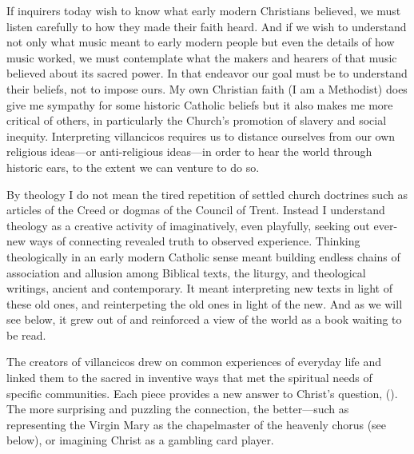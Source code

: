 
If inquirers today wish to know what early modern Christians believed, we
must listen carefully to how they made their faith heard.
And if we wish to understand not only what music meant to early
modern people but even the details of how music worked, we must contemplate
what the makers and hearers of that music believed about its sacred power. 
In that endeavor our goal must be to understand their beliefs, not to impose
ours.
My own Christian faith (I am a Methodist) does give me sympathy for some
historic Catholic beliefs but it also makes me more critical of others, in
particularly the Church's promotion of slavery and social inequity.
Interpreting villancicos requires us to distance ourselves from our own
religious ideas---or anti-religious ideas---in order to hear the world through
historic ears, to the extent we can venture to do so.%
    \Autocites
    {Burstyn:PeriodEar}
    [for an example of the anti-religious approach, see][]{Menache:Vox}

By theology I do not mean the tired repetition of settled church doctrines such
as articles of the Creed or dogmas of the Council of Trent.
Instead I understand theology as a creative activity of imaginatively, even
playfully, seeking out ever-new ways of connecting revealed truth to observed
experience.
Thinking theologically in an early modern Catholic sense meant building 
endless chains of association and allusion among Biblical texts, the liturgy,
and theological writings, ancient and contemporary.
It meant interpreting new texts in light of these old ones, and reinterpeting
the old ones in light of the new.
And as we will see below, it grew out of and reinforced a view of the world as
a book waiting to be read.


The creators of villancicos drew on common experiences of everyday life and
linked them to the sacred in inventive ways that met the spiritual needs of
specific communities.
Each piece provides a new answer to Christ's question, 
().
The more surprising and puzzling the connection, the better---such as
representing the Virgin Mary as the chapelmaster of the heavenly chorus (see
below), or imagining Christ as a gambling card player.%
    \Autocite{Cashner:Cards}


